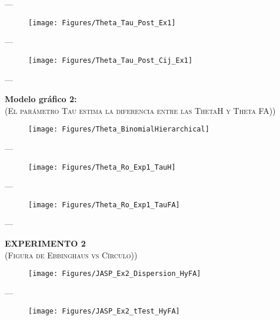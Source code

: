 \documentclass[a4paper ]{article}
\begin{document}
---
\begin{figure}[h]
\centering
\texttt{[image: Figures/Theta\_Tau\_Post\_Ex1]}
\end{figure}
\clearpage


---
\begin{figure}[h]
\centering
\texttt{[image: Figures/Theta\_Tau\_Post\_Cij\_Ex1]}
\end{figure}
\clearpage

---
\begin{center}
{\LARGE \textbf{Modelo gráfico 2:} }\\
{\small \textsc{(El parámetro Tau estima la diferencia entre las ThetaH y Theta FA))}}\\
\smallskip
\end{center}

\begin{figure}[h]
\centering
\texttt{[image: Figures/Theta\_BinomialHierarchical]}
\end{figure}
\clearpage




---
\begin{figure}[h]
\centering
\texttt{[image: Figures/Theta\_Ro\_Exp1\_TauH]}
\end{figure}
\clearpage


---
\begin{figure}[h]
\centering
\texttt{[image: Figures/Theta\_Ro\_Exp1\_TauFA]}
\end{figure}
\clearpage








---
\begin{center}
{\LARGE \textbf{EXPERIMENTO 2} }\\
{\small \textsc{(Figura de Ebbinghaus vs Círculo))}}\\
\smallskip
\end{center}

\begin{figure}[h]
\centering
\texttt{[image: Figures/JASP\_Ex2\_Dispersion\_HyFA]}
\end{figure}
\clearpage




---
\begin{figure}[h]
\centering
\texttt{[image: Figures/JASP\_Ex2\_tTest\_HyFA]}
\end{figure}
\clearpage
\end{document}
